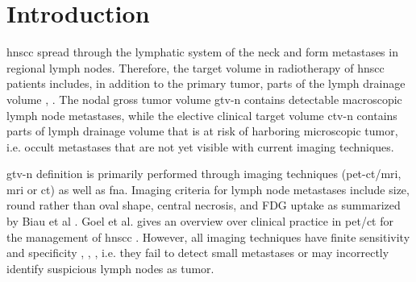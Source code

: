 \documentclass[\relativeRoot/main.tex]{subfiles}
\begin{document}
\section{Introduction}
\label{sec:dataset_usz:introduction}

\Gls{hnscc} spread through the lymphatic system of the neck and form metastases in regional lymph nodes. Therefore, the target volume in radiotherapy of \gls{hnscc} patients includes, in addition to the primary tumor, parts of the lymph drainage volume \cite{biau_selection_2019}, \cite{grosu_target_2015}. The nodal gross tumor volume \gls{gtv-n} contains detectable macroscopic lymph node metastases, while the elective clinical target volume \gls{ctv-n} contains parts of lymph drainage volume that is at risk of harboring microscopic tumor, i.e. occult metastases that are not yet visible with current imaging techniques.

\Gls{gtv-n} definition is primarily performed through imaging techniques (\gls{pet}-\gls{ct}/\gls{mri}, \gls{mri} or \gls{ct}) as well as \gls{fna}. Imaging criteria for lymph node metastases include size, round rather than oval shape, central necrosis, and FDG uptake as summarized by Biau et al \cite{biau_selection_2019}. Goel et al. gives an overview over clinical practice in \gls{pet}/\gls{ct} for the management of \gls{hnscc} \cite{goel_clinical_2017}. However, all imaging techniques have finite sensitivity and specificity \cite{park_diagnostic_2020}, \cite{jensen_imaging_2021}, \cite{rohde_18f-fluoro-deoxy-glucose-positron_2014}, i.e. they fail to detect small metastases or may incorrectly identify suspicious lymph nodes as tumor.
\end{document}
